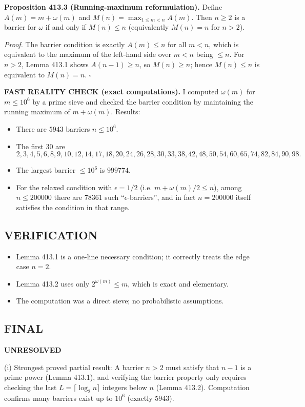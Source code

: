 \textbf{Proposition 413.3 (Running-maximum reformulation).}
Define $A(m)=m+\omega(m)$ and $M(n)=\max_{1\le m<n} A(m)$.
Then $n\ge2$ is a barrier for $\omega$ if and only if $M(n)\le n$ (equivalently $M(n)=n$ for $n>2$).

\textit{Proof.}
The barrier condition is exactly $A(m)\le n$ for all $m<n$, which is equivalent to the maximum of the left-hand side over $m<n$ being $\le n$.
For $n>2$, Lemma 413.1 shows $A(n-1)\ge n$, so $M(n)\ge n$; hence $M(n)\le n$ is equivalent to $M(n)=n$.
\hfill$\square$

\textbf{FAST REALITY CHECK (exact computations).}
I computed $\omega(m)$ for $m\le 10^6$ by a prime sieve and checked the barrier condition by maintaining the running maximum of $m+\omega(m)$.
Results:
\begin{itemize}
  \item There are $5943$ barriers $n\le 10^6$.
  \item The first $30$ are
  $$2,3,4,5,6,8,9,10,12,14,17,18,20,24,26,28,30,33,38,42,48,50,54,60,65,74,82,84,90,98.$$
  \item The largest barrier $\le 10^6$ is $999774$.
  \item For the relaxed condition with $\epsilon=1/2$ (i.e. $m+\omega(m)/2\le n$), among $n\le 200000$ there are $78361$ such ``$\epsilon$-barriers'', and in fact $n=200000$ itself satisfies the condition in that range.
\end{itemize}

\subsection*{VERIFICATION}
\begin{itemize}
  \item Lemma 413.1 is a one-line necessary condition; it correctly treats the edge case $n=2$.
  \item Lemma 413.2 uses only $2^{\omega(m)}\le m$, which is exact and elementary.
  \item The computation was a direct sieve; no probabilistic assumptions.
\end{itemize}

\subsection*{FINAL}
\textbf{UNRESOLVED}

(i) Strongest proved partial result: A barrier $n>2$ must satisfy that $n-1$ is a prime power (Lemma 413.1), and verifying the barrier property only requires checking the last $L=\lceil \log_2 n\rceil$ integers below $n$ (Lemma 413.2). Computation confirms many barriers exist up to $10^6$ (exactly $5943$).

